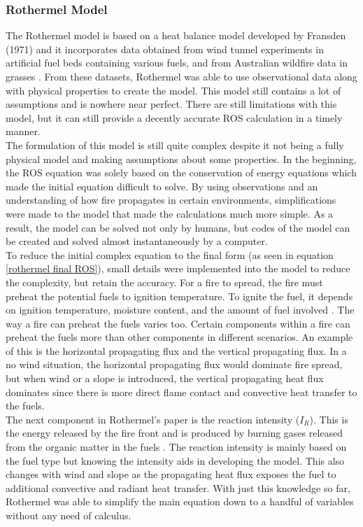 \documentclass{article}
\begin{document}
\subsubsection{Rothermel Model}

The Rothermel model is based on a heat balance model developed by Fransden (1971) and it incorporates data obtained from wind tunnel experiments in artificial fuel beds containing various fuels, and from Australian wildfire data in grasses \citep{Anderson2010}. From these datasets, Rothermel was able to use observational data along with physical properties to create the model. This model still contains a lot of assumptions and is nowhere near perfect. There are still limitations with this model, but it can still provide a decently accurate ROS calculation in a timely manner. \\
\indent The formulation of this model is still quite complex despite it not being a fully physical model and making assumptions about some properties. In the beginning, the ROS equation was solely based on the conservation of energy equations which made the initial equation difficult to solve. By using observations and an understanding of how fire propagates in certain environments, simplifications were made to the model that made the calculations much more simple. As a result, the model can be solved not only by humans, but codes of the model can be created and solved almost instantaneously by a computer. \\
\indent To reduce the initial complex equation to the final form (as seen in equation \ref{rothermel final ROS}), small details were implemented into the model to reduce the complexity, but retain the accuracy. For a fire to spread, the fire must preheat the potential fuels to ignition temperature. To ignite the fuel, it depends on ignition temperature, moisture content, and the amount of fuel involved \citep{Rothermel1972}. The way a fire can preheat the fuels varies too. Certain components within a fire can preheat the fuels more than other components in different scenarios. An example of this is the horizontal propagating flux and the vertical propagating flux. In a no wind situation, the horizontal propagating flux would dominate fire spread, but when wind or a slope is introduced, the vertical propagating heat flux dominates since there is more direct flame contact and convective heat transfer to the fuels. \\
\indent The next component in Rothermel's paper is the reaction intensity ($I_R$). This is the energy released by the fire front and is produced by burning gases released from the organic matter in the fuels \citep{Rothermel1972}. The reaction intensity is mainly based on the fuel type but knowing the intensity aids in developing the model. This also changes with wind and slope as the propagating heat flux exposes the fuel to additional convective and radiant heat transfer. With just this knowledge so far, Rothermel was able to simplify the main equation down to a handful of variables without any need of calculus.\\
\end{document}
